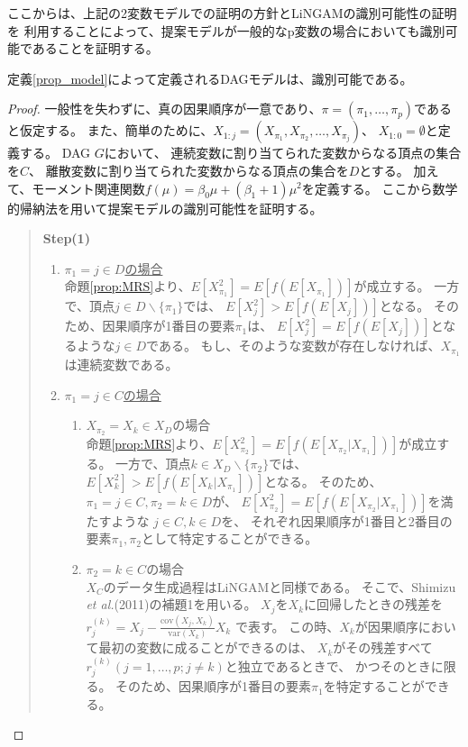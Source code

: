 ここからは、上記の2変数モデルでの証明の方針とLiNGAMの識別可能性の証明\cite{Shimizu2011-pd}を
利用することによって、提案モデルが一般的なp変数の場合においても識別可能であることを証明する。

\begin{theo}[提案モデルの識別可能性]
  定義\ref{prop_model}によって定義されるDAGモデルは、識別可能である。
\end{theo}

\begin{proof}
  一般性を失わずに、真の因果順序が一意であり、$\pi = (\pi_1, \dots, \pi_p)$であると仮定する。
  また、簡単のために、$X_{1:j} = (X_{\pi_1}, X_{\pi_2}, \dots, X_{\pi_j})$、
  $X_{1:0} = \emptyset$と定義する。
  DAG $G$において、
  連続変数に割り当てられた変数からなる頂点の集合を$C$、
  離散変数に割り当てられた変数からなる頂点の集合を$D$とする。
  加えて、モーメント関連関数$f(\mu) = \beta_0 \mu + (\beta_1 + 1)\mu^2$を定義する。
  ここから数学的帰納法を用いて提案モデルの識別可能性を証明する。

  \begin{quote}
    \textbf{Step(1)}
    \begin{enumerate}[label=(\roman*)]
      \item
      \underline{$\pi_1 = j \in D$の場合} \\
      命題\ref{prop:MRS}より、$E[X_{\pi_1}^2] = E[f(E[X_{\pi_1}])]$が成立する。
      一方で、頂点$j \in D \backslash \{\pi_1\}$では、
      $E[X_j^2] > E[f(E[X_j])]$となる。
      そのため、因果順序が1番目の要素$\pi_1$は、
      $E[X_j^2] = E[f(E[X_j])]$となるような$j \in D$である。
      もし、そのような変数が存在しなければ、$X_{\pi_1}$は連続変数である。

      \item
      \underline{$\pi_1 = j \in C$の場合}
      \begin{enumerate}[label=(ii - \alph*)]
        \item
        $X_{\pi_2} = X_k \in X_D$の場合 \\
        命題\ref{prop:MRS}より、$E[X_{\pi_2}^2] = E[f(E[X_{\pi_2} | X_{\pi_1}])]$が成立する。
        一方で、頂点$k \in X_D \backslash \{\pi_2\}$では、
        $E[X_k^2] > E[f(E[X_k | X_{\pi_1}])]$となる。
        そのため、$\pi_1 = j \in C, \pi_2 = k \in D$が、
        $E[X_{\pi_2}^2] = E[f(E[X_{\pi_2} | X_{\pi_1}])]$を満たすような
        $j \in C, k \in D$を、
        それぞれ因果順序が1番目と2番目の要素$\pi_1, \pi_2$として特定することができる。

        \item
        $\pi_2 = k \in C$の場合 \\
        $X_C$のデータ生成過程はLiNGAM\cite{Shimizu2006-yu}と同様である。
        そこで、Shimizu \textit{et al.}(2011)\cite{Shimizu2011-pd}の補題1を用いる。
        $X_j$を$X_k$に回帰したときの残差を
        $r_j^{(k)} = X_j - \frac{\text{cov}(X_j, X_k)}{\text{var}(X_k)} X_k$
        で表す。
        この時、$X_k$が因果順序において最初の変数に成ることができるのは、
        $X_k$がその残差すべて$r_j^{(k)} (j = 1,\dots,p; j \neq k)$と独立であるときで、
        かつそのときに限る。
        そのため、因果順序が1番目の要素$\pi_1$を特定することができる。


\end{enumerate}
\end{enumerate}
\end{quote}
\end{proof}
